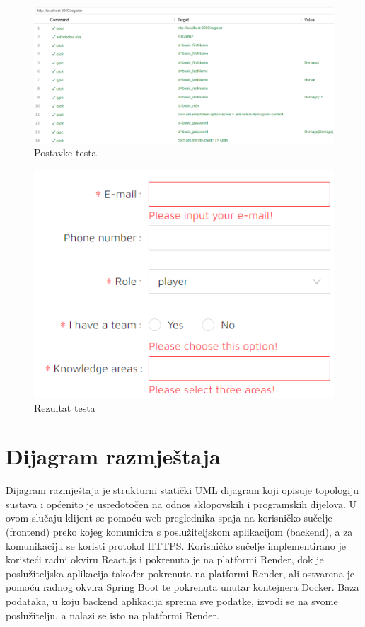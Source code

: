 				\begin{figure}[H]
					\includegraphics[width=\textwidth]{slike/NeuspjesnaRegistracija1.PNG} 
					\caption{Postavke testa}
					\label{fig:NeuspjesnaRegistracija1}
				\end{figure}

				\begin{figure}[H]
					\includegraphics[width=\textwidth]{slike/NeuspjesnaRegistracija2.PNG} 
					\caption{Rezultat testa}
					\label{fig:NeuspjesnaRegistracija2}
				\end{figure}
				
			\eject


		
		
		\section{Dijagram razmještaja}
			
			Dijagram razmještaja je strukturni statički UML dijagram koji opisuje topologiju sustava i općenito je usredotočen na odnos sklopovskih i programskih dijelova. U ovom slučaju klijent se pomoću web preglednika spaja na korisničko sučelje (frontend) preko kojeg komunicira s poslužiteljskom aplikacijom (backend), a za komunikaciju se koristi protokol HTTPS. Korisničko sučelje  implementirano je koristeći radni okviru React.js i pokrenuto je na platformi Render, dok je poslužiteljska aplikacija također pokrenuta na platformi Render, ali ostvarena je pomoću radnog okvira Spring Boot te pokrenuta unutar kontejnera Docker. Baza podataka, u koju backend aplikacija sprema sve podatke, izvodi se na svome poslužitelju, a nalazi se isto na platformi Render.
			
